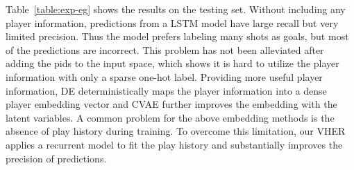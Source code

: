 \documentclass[letterpaper]{article} %
\newcommand{\home}{\it{Home}}
\newcommand{\away}{\it{Away}}
\newcommand{\none}{\it{Neither}}
\newcommand{\egoal}{\it{goal}}
\begin{document}
Table~\ref{table:exp-eg} shows the results on the testing set. Without including any player information, predictions from a LSTM model have large recall but very limited precision. Thus the model prefers labeling many shots as goals, but most of the predictions are incorrect. This problem has not been alleviated after adding the pids to the input space, which shows it is hard to utilize the player information with only a sparse one-hot label. Providing more useful player information, DE deterministically maps the player information into a dense player embedding vector and CVAE further improves the embedding with the latent variables. A common problem for the above embedding methods is the absence of play history during training. To overcome this limitation, our VHER applies a recurrent model to fit the play history and substantially improves the precision of predictions. 




\end{document}
